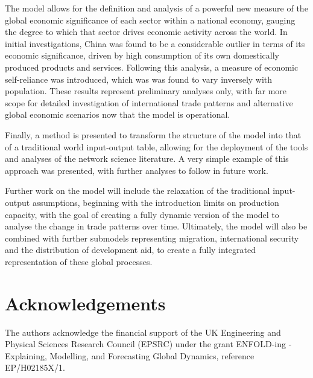 \documentclass[a4paper]{article}
\begin{document}
The model allows for the definition and analysis of a powerful new measure of the global economic significance of each sector within a national economy, gauging the degree to which that sector drives economic activity across the world. In initial investigations, China was found to be a considerable outlier in terms of its economic significance, driven by high consumption of its own domestically produced products and services. Following this analysis, a measure of economic self-reliance was introduced, which was was found to vary inversely with population. These results represent preliminary analyses only, with far more scope for detailed investigation of international trade patterns and alternative global economic scenarios now that the model is operational.

Finally, a method is presented to transform the structure of the model into that of a traditional world input-output table, allowing for the deployment of the tools and analyses of the network science literature. A very simple example of this approach was presented, with further analyses to follow in future work.

Further work on the model will include the relaxation of the traditional input-output assumptions, beginning with the introduction limits on production capacity, with the goal of creating a fully dynamic version of the model to analyse the change in trade patterns over time. Ultimately, the model will also be combined with further submodels representing migration, international security and the distribution of development aid, to create a fully integrated representation of these global processes.






\section*{Acknowledgements}

The authors acknowledge the financial support of the UK Engineering and Physical Sciences Research Council (EPSRC) under the grant ENFOLD-ing - Explaining, \linebreak Modelling, and Forecasting Global Dynamics, reference \linebreak EP/H02185X/1. 



\printbibliography
\end{document}
